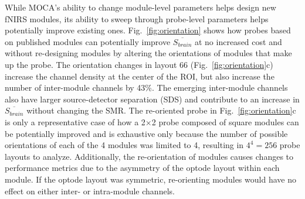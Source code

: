 While MOCA's ability to change module-level parameters helps design new \ac{fNIRS} modules, its ability to sweep through probe-level parameters helps potentially improve existing ones. Fig.~\ref{fig:orientation} shows how probes based on published modules can potentially improve $\overline{S_{brain}}$ at no increased cost and without re-designing modules by altering the orientations of modules that make up the probe. The orientation changes in layout 66 (Fig.~\ref{fig:orientation}c) increase the channel density at the center of the ROI, but also increase the number of inter-module channels by 43\%. The emerging inter-module channels also have larger source-detector separation (SDS) and contribute to an increase in $\overline{S_{brain}}$ without changing the SMR. The re-oriented probe in Fig.~\ref{fig:orientation}c is only a representative case of how a 2$\times$2 probe composed of square modules can be potentially improved and is exhaustive only because the number of possible orientations of each of the 4 modules was limited to 4, resulting in $4^4=256$ probe layouts to analyze. Additionally, the re-orientation of modules causes changes to performance metrics due to the asymmetry of the optode layout within each module. If the optode layout was symmetric, re-orienting modules would have no effect on either inter- or intra-module channels. 

